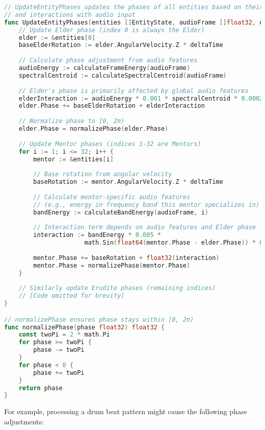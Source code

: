\begin{lstlisting}[language=Go, caption=Phase Evolution Code in Go]
// UpdateEntityPhases updates the phases of all entities based on their angular velocities
// and interactions with audio input
func UpdateEntityPhases(entities []EntityState, audioFrame []float32, deltaTime float32) {
    // Update Elder phase (index 0 is always the Elder)
    elder := &entities[0]
    baseElderRotation := elder.AngularVelocity.Z * deltaTime
    
    // Calculate phase adjustment from audio features
    audioEnergy := calculateFrameEnergy(audioFrame)
    spectralCentroid := calculateSpectralCentroid(audioFrame)
    
    // Elder's phase is primarily affected by global audio features
    elderInteraction := audioEnergy * 0.001 * spectralCentroid * 0.0002
    elder.Phase += baseElderRotation + elderInteraction
    
    // Normalize phase to [0, 2π)
    elder.Phase = normalizePhase(elder.Phase)
    
    // Update Mentor phases (indices 1-32 are Mentors)
    for i := 1; i <= 32; i++ {
        mentor := &entities[i]
        
        // Base rotation from angular velocity
        baseRotation := mentor.AngularVelocity.Z * deltaTime
        
        // Calculate mentor-specific audio features 
        // (e.g., energy in frequency band this mentor specializes in)
        bandEnergy := calculateBandEnergy(audioFrame, i)
        
        // Interaction term depends on audio features and Elder phase
        interaction := bandEnergy * 0.005 * 
                      math.Sin(float64(mentor.Phase - elder.Phase)) * 0.02
        
        mentor.Phase += baseRotation + float32(interaction)
        mentor.Phase = normalizePhase(mentor.Phase)
    }
    
    // Similarly update Erudite phases (remaining indices)
    // [Code omitted for brevity]
}

// normalizePhase ensures phase stays within [0, 2π)
func normalizePhase(phase float32) float32 {
    const twoPi = 2 * math.Pi
    for phase >= twoPi {
        phase -= twoPi
    }
    for phase < 0 {
        phase += twoPi
    }
    return phase
}
\end{lstlisting}

For example, processing a drum beat pattern might cause the following phase adjustments:

